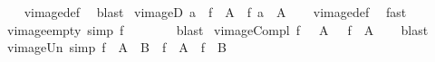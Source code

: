 \begin{isabellebody}
%
\isadelimproof
\ \ %
\endisadelimproof
%
\isatagproof
{}\isamarkupfalse%
\ vimage{\isacharunderscore}{\kern0pt}def\ \isamarkupfalse%
\ blast%
\endisatagproof
{\isafoldproof}%
%
\isadelimproof
\isanewline
%
\endisadelimproof
\isanewline
{}\isamarkupfalse%
\ vimageD{\isacharcolon}{\kern0pt}\ {\isachardoublequoteopen}a\ {\isasymin}\ f\ {\isacharminus}{\kern0pt}{\isacharbackquote}{\kern0pt}\ A\ {\isasymLongrightarrow}\ f\ a\ {\isasymin}\ A{\isachardoublequoteclose}\isanewline
%
\isadelimproof
\ \ %
\endisadelimproof
%
\isatagproof
{}\isamarkupfalse%
\ vimage{\isacharunderscore}{\kern0pt}def\ \isamarkupfalse%
\ fast%
\endisatagproof
{\isafoldproof}%
%
\isadelimproof
\isanewline
%
\endisadelimproof
\isanewline
{}\isamarkupfalse%
\ vimage{\isacharunderscore}{\kern0pt}empty\ {\isacharbrackleft}{\kern0pt}simp{\isacharbrackright}{\kern0pt}{\isacharcolon}{\kern0pt}\ {\isachardoublequoteopen}f\ {\isacharminus}{\kern0pt}{\isacharbackquote}{\kern0pt}\ {\isacharbraceleft}{\kern0pt}{\isacharbraceright}{\kern0pt}\ {\isacharequal}{\kern0pt}\ {\isacharbraceleft}{\kern0pt}{\isacharbraceright}{\kern0pt}{\isachardoublequoteclose}\isanewline
%
\isadelimproof
\ \ %
\endisadelimproof
%
\isatagproof
{}\isamarkupfalse%
\ blast%
\endisatagproof
{\isafoldproof}%
%
\isadelimproof
\isanewline
%
\endisadelimproof
\isanewline
{}\isamarkupfalse%
\ vimage{\isacharunderscore}{\kern0pt}Compl{\isacharcolon}{\kern0pt}\ {\isachardoublequoteopen}f\ {\isacharminus}{\kern0pt}{\isacharbackquote}{\kern0pt}\ {\isacharparenleft}{\kern0pt}{\isacharminus}{\kern0pt}\ A{\isacharparenright}{\kern0pt}\ {\isacharequal}{\kern0pt}\ {\isacharminus}{\kern0pt}\ {\isacharparenleft}{\kern0pt}f\ {\isacharminus}{\kern0pt}{\isacharbackquote}{\kern0pt}\ A{\isacharparenright}{\kern0pt}{\isachardoublequoteclose}\isanewline
%
\isadelimproof
\ \ %
\endisadelimproof
%
\isatagproof
{}\isamarkupfalse%
\ blast%
\endisatagproof
{\isafoldproof}%
%
\isadelimproof
\isanewline
%
\endisadelimproof
\isanewline
{}\isamarkupfalse%
\ vimage{\isacharunderscore}{\kern0pt}Un\ {\isacharbrackleft}{\kern0pt}simp{\isacharbrackright}{\kern0pt}{\isacharcolon}{\kern0pt}\ {\isachardoublequoteopen}f\ {\isacharminus}{\kern0pt}{\isacharbackquote}{\kern0pt}\ {\isacharparenleft}{\kern0pt}A\ {\isasymunion}\ B{\isacharparenright}{\kern0pt}\ {\isacharequal}{\kern0pt}\ {\isacharparenleft}{\kern0pt}f\ {\isacharminus}{\kern0pt}{\isacharbackquote}{\kern0pt}\ A{\isacharparenright}{\kern0pt}\ {\isasymunion}\ {\isacharparenleft}{\kern0pt}f\ {\isacharminus}{\kern0pt}{\isacharbackquote}{\kern0pt}\ B{\isacharparenright}{\kern0pt}{\isachardoublequoteclose}\isanewline

\end{isabellebody}
